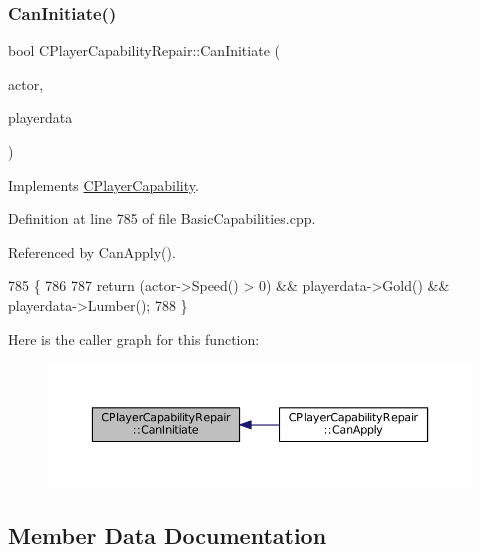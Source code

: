 \subsubsection{\texorpdfstring{Can\+Initiate()}{CanInitiate()}}
{\footnotesize\ttfamily bool C\+Player\+Capability\+Repair\+::\+Can\+Initiate (\begin{DoxyParamCaption}\item[{std\+::shared\+\_\+ptr$<$ \hyperlink{classCPlayerAsset}{C\+Player\+Asset} $>$}]{actor,  }\item[{std\+::shared\+\_\+ptr$<$ \hyperlink{classCPlayerData}{C\+Player\+Data} $>$}]{playerdata }\end{DoxyParamCaption})\hspace{0.3cm}{\ttfamily [virtual]}}



Implements \hyperlink{classCPlayerCapability_aa83b1e1fcaff2985c378132d679154ea}{C\+Player\+Capability}.



Definition at line 785 of file Basic\+Capabilities.\+cpp.



Referenced by Can\+Apply().


\begin{DoxyCode}
785                                                                                                            
                \{
786     
787     \textcolor{keywordflow}{return} (actor->Speed() > 0) && playerdata->Gold() && playerdata->Lumber();
788 \}
\end{DoxyCode}
Here is the caller graph for this function\+:\nopagebreak
\begin{figure}[H]
\begin{center}
\leavevmode
\includegraphics[width=350pt]{classCPlayerCapabilityRepair_a579761cab74d447b95856a24a7841b2e_icgraph}
\end{center}
\end{figure}


\subsection{Member Data Documentation}
\hypertarget{classCPlayerCapabilityRepair_ac0cc247c8d2ba96b6c6feabfcfb6ac19}{}\label{classCPlayerCapabilityRepair_ac0cc247c8d2ba96b6c6feabfcfb6ac19} 
